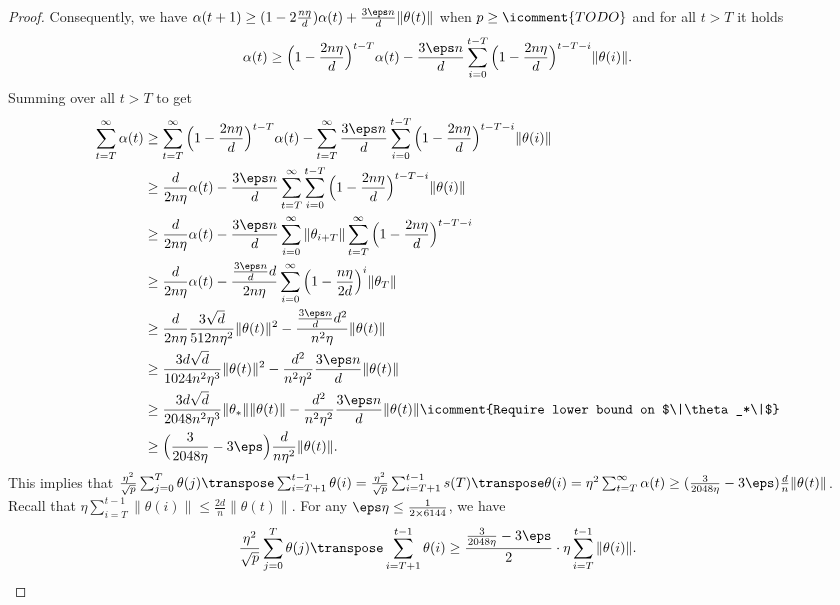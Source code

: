 \begin{proof}
    Consequently, we have $\alpha(t+1) \geq (1-2\frac{n\eta}{d})\alpha(t) + \frac{3\eps n}{d}\|\theta(t)\|$ when $p\geq \icomment{TODO}$ and for all $t>T$ it holds
    \begin{align*}
        \alpha(t) \geq \Big( 1-\frac{2n\eta}{d} \Big)^{t-T}\alpha(t) - \frac{3\eps n}{d} \sum_{i=0}^{t-T} \Big( 1-\frac{2n\eta}{d} \Big)^{t-T-i} \|\theta(i)\|.
    \end{align*}
    Summing over all $t>T$ to get
    \begin{align*}
        \sum_{t=T}^\infty\alpha(t) & \geq \sum_{t=T}^\infty \Big( 1-\frac{2n\eta}{d} \Big)^{t-T}\alpha(t) - \sum_{t=T}^\infty \frac{3\eps n}{d} \sum_{i=0}^{t-T} \Big( 1-\frac{2n\eta}{d} \Big)^{t-T-i}\|\theta(i)\| \\
        & \geq \frac{d}{2n\eta}\alpha(t) - \frac{3\eps n}{d} \sum_{t=T}^\infty\sum_{i=0}^{t-T} \Big( 1-\frac{2n\eta}{d} \Big)^{t-T-i}\|\theta(i)\| \\
        &\geq \frac{d}{2n\eta}\alpha(t) - \frac{3\eps n}{d} \sum_{i=0}^\infty\|\theta_{i+T}\|\sum_{t=T}^\infty \Big( 1-\frac{2n\eta}{d} \Big)^{t-T-i} \\
        &\geq \frac{d}{2n\eta}\alpha(t) - \frac{\frac{3\eps n}{d} d}{2n\eta} \sum_{i=0}^\infty \Big( 1-\frac{n\eta}{2d} \Big)^i \|\theta_{T}\| \\
        &\geq \frac{d}{2n\eta} \frac{3\sqrt{d}}{512n\eta^2} \|\theta(t)\|^2 - \frac{\frac{3\eps n}{d} d^2}{n^2\eta} \|\theta(t)\| \\
        &\geq \frac{3d\sqrt{d}}{1024n^2\eta^3} \|\theta(t)\|^2 - \frac{d^2}{n^2\eta^2} \frac{3\eps n}{d} \|\theta(t)\| \\
        &\geq \frac{3d\sqrt{d}}{2048n^2\eta^3} \|\theta_*\| \|\theta(t)\| - \frac{d^2}{n^2\eta^2} \frac{3\eps n}{d} \|\theta(t)\| \icomment{Require lower bound on $\|\theta_*\|$} \\
        & \geq \Big( \frac{3}{2048\eta} - 3\eps \Big) \frac{d}{n\eta^2} \|\theta(t)\|.
    \end{align*}
    This implies that $\frac{\eta^2}{\sqrt p}\sum_{j=0}^T \theta(j)\transpose \sum_{i=T+1}^{t-1} \theta(i) = \frac{\eta^2}{\sqrt p} \sum_{i=T+1}^{t-1} s(T)\transpose \theta(i) = \eta^2 \sum_{t=T}^\infty\alpha(t) \geq ( \frac{3}{2048\eta} - 3\eps ) \frac{d}{n} \|\theta(t)\|$. Recall that $\eta\sum_{i=T}^{t-1} \|\theta(i)\| \leq \frac{2d}{n} \|\theta(t)\|$. For any $\eps\eta \leq \frac{1}{2\times 6144}$, we have
    \begin{align*}
        \frac{\eta^2}{\sqrt p}\sum_{j=0}^T \theta(j)\transpose \sum_{i=T+1}^{t-1} \theta(i) \geq \frac{\frac{3}{2048\eta} - 3\eps}{2} \cdot \eta\sum_{i=T}^{t-1} \|\theta(i)\|.
    \end{align*}
    

\end{proof}
